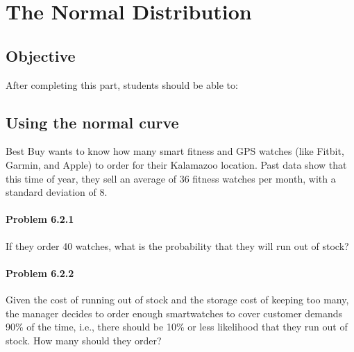 \documentclass[11pt, chapterprefix=true]{scrbook}\usepackage[]{graphicx}\usepackage[]{color}
\begin{document}
\onecolumn



\chapter{The Normal Distribution}
\label{chap:ch6}

\section{Objective}

After completing this part, students should be able to:


\section{Using the normal curve} 

Best Buy wants to know how many smart fitness and GPS watches (like Fitbit, Garmin, and Apple) to order for their Kalamazoo location. Past data show that this time of year, they sell an average of 36 fitness watches per month, with a standard deviation of 8.

\subsubsection{Problem 6.2.1}  If they order 40 watches, what is the probability that they will run out of stock?

\subsubsection{Problem 6.2.2}  \label{LBL622} Given the cost of running out of stock and the storage cost of keeping too many, the manager decides to order enough smartwatches to cover customer demands 90\% of the time, i.e., there should be 10\% or less likelihood that they run out of stock. How many should they order?
\end{document}
